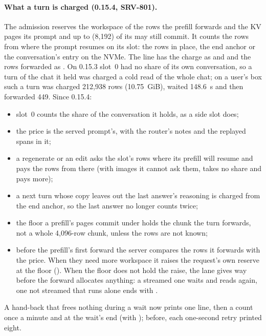 \paragraph{What a turn is charged (0.15.4, SRV-801).} The admission reserves the workspace of the rows the prefill forwards and the KV pages its prompt and up to  (8,192) of its  may still commit. It counts the rows from where the prompt resumes on its slot: the rows in place, the end anchor or the conversation's entry on the NVMe. The \code{[req]} line has the charge as  and  and the rows forwarded as . On 0.15.3 slot~0 had no share of its own conversation, so a turn of the chat it held was charged a cold read of the whole chat; on a user's box such a turn was charged 212,938 rows (10.75~GiB), waited 148.6~s and then forwarded 449. Since 0.15.4:

\begin{itemize}
\item slot~0 counts the share of the conversation it holds, as a side slot does;
\item the price is the served prompt's, with the router's notes and the replayed spans in it;
\item a regenerate or an edit asks the slot's rows where its prefill will resume and pays the rows from there (with images it cannot ask them, takes no share and pays more);
\item a next turn whose copy leaves out the last answer's reasoning is charged from the end anchor, so the last answer no longer counts twice;
\item the floor a prefill's pages commit under holds the chunk the turn forwards, not a whole 4,096-row chunk, unless the rows are not known;
\item before the prefill's first forward the server compares the rows it forwards with the price. When they need more workspace it raises the request's own reserve at the floor (). When the floor does not hold the raise, the lane gives way before the forward allocates anything: a streamed one waits and reads again, one not streamed that runs alone ends with .
\end{itemize}

A hand-back that frees nothing during a wait now prints one line, then a count once a minute and at the wait's end (with ); before, each one-second retry printed eight.


